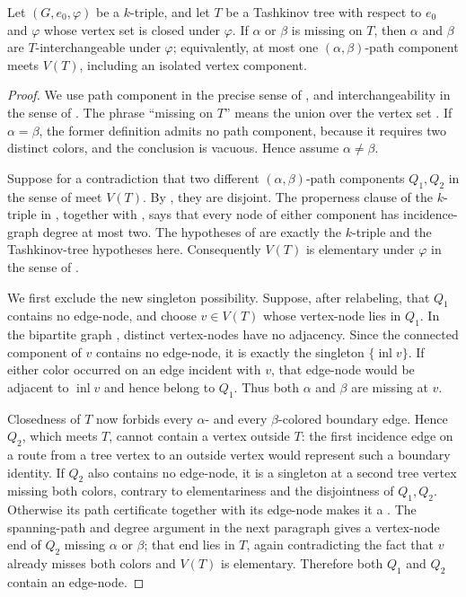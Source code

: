 \begin{lemma}
Let $(G,e_0,\varphi)$ be a $k$-triple, and let $T$ be a Tashkinov
tree with respect to $e_0$ and $\varphi$ whose vertex set is closed under
$\varphi$.  If $\alpha$ or $\beta$ is missing on $T$, then $\alpha$ and
$\beta$ are $T$-interchangeable under $\varphi$; equivalently, at most one
$(\alpha,\beta)$-path component meets $V(T)$, including an isolated
vertex component.
\end{lemma}
\begin{proof}
We use path component in the precise sense of
, and interchangeability in the sense of
.  The phrase ``missing on $T$'' means the
union  over the vertex set
.  If $\alpha=\beta$, the former definition
admits no path component, because it requires two distinct colors, and the
conclusion is vacuous.  Hence assume $\alpha\ne\beta$.

Suppose for a contradiction that two different $(\alpha,\beta)$-path
components $Q_1,Q_2$ in the sense of  meet
$V(T)$.  By
, they are disjoint.  The properness
clause of the $k$-triple in , together with
, says that every node of either
component has incidence-graph degree at most two.  The hypotheses of
 are exactly the $k$-triple and the Tashkinov-tree
hypotheses here.  Consequently $V(T)$ is elementary under $\varphi$ in
the sense of .

We first exclude the new singleton possibility.  Suppose, after relabeling,
that $Q_1$ contains no edge-node, and choose
$v\in V(T)$ whose vertex-node lies in $Q_1$.  In the bipartite graph
, distinct vertex-nodes have no adjacency.
Since the connected component of $v$ contains no edge-node, it is exactly
the singleton $\{\operatorname{inl}v\}$.  If either color occurred on an
edge incident with $v$, that edge-node would be adjacent to
$\operatorname{inl}v$ and hence belong to $Q_1$.  Thus both $\alpha$ and
$\beta$ are missing at $v$.

Closedness of $T$ now forbids every $\alpha$- and every $\beta$-colored
boundary edge.  Hence $Q_2$, which meets $T$, cannot contain a vertex
outside $T$: the first incidence edge on a route from a tree vertex to an
outside vertex would represent such a boundary identity.  If $Q_2$ also
contains no edge-node, it is a singleton at a second tree vertex missing
both colors, contrary to elementariness and the disjointness of $Q_1,Q_2$.
Otherwise its path certificate together with its edge-node makes it a
.  The spanning-path and degree
argument in the next paragraph gives a vertex-node end of $Q_2$ missing
$\alpha$ or $\beta$; that end lies in $T$, again contradicting the fact
that $v$ already misses both colors and $V(T)$ is elementary.  Therefore
both $Q_1$ and $Q_2$ contain an edge-node.


\end{proof}
